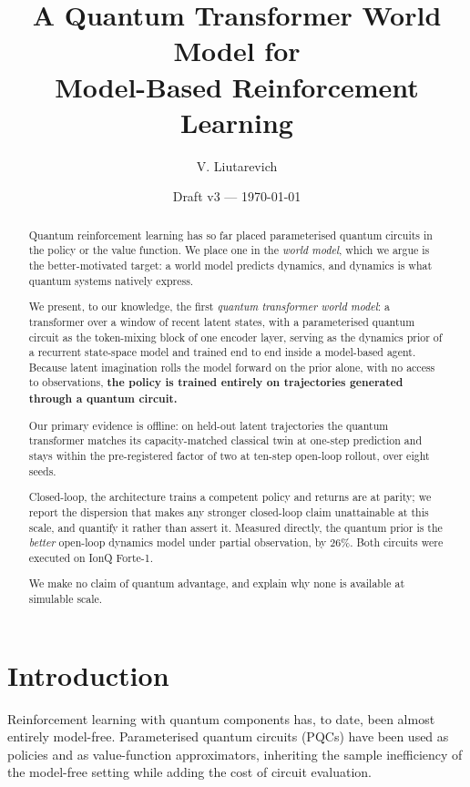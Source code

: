 \documentclass[11pt]{article}
\title{\bfseries A Quantum Transformer World Model for\\
       Model-Based Reinforcement Learning}
\author{V. Liutarevich}
\date{Draft v3 --- \today}
\newif\ifdraft
\newcommand{\pend}[1]{%
  \ifdraft\textcolor{PendFG}{\textbf{[TODO:} \textit{#1}\textbf{]}}\fi}
\begin{document}
\maketitle

\begin{abstract}
Quantum reinforcement learning has so far placed parameterised quantum
circuits in the policy or the value function. We place one in the
\emph{world model}, which we argue is the better-motivated target: a
world model predicts dynamics, and dynamics is what quantum systems
natively express.

We present, to our knowledge, the first \emph{quantum transformer world
model}: a transformer over a window of recent latent states, with a
parameterised quantum circuit as the token-mixing block of one encoder
layer, serving as the dynamics prior of a recurrent state-space model
and trained end to end inside a model-based agent. Because latent
imagination rolls the model forward on the prior alone, with no access
to observations, \textbf{the policy is trained entirely on trajectories
generated through a quantum circuit.}

Our primary evidence is offline: on held-out latent trajectories the
quantum transformer matches its capacity-matched classical twin at
one-step prediction and stays within the pre-registered factor of two at
ten-step open-loop rollout, over eight seeds.
\pend{replace with the measured figures from the width-matched context
sweep; see Section~\ref{sec:offline}}
Closed-loop, the architecture trains a competent policy and returns are
at parity; we report the dispersion that makes any stronger closed-loop
claim unattainable at this scale, and quantify it rather than assert it.
Measured directly, the quantum prior is the \emph{better} open-loop
dynamics model under partial observation, by $26\%$. Both circuits were
executed on IonQ Forte-1.

We make no claim of quantum advantage, and explain why none is available
at simulable scale.
\end{abstract}

\section{Introduction}
Reinforcement learning with quantum components has, to date, been almost
entirely model-free. Parameterised quantum circuits (PQCs) have been
used as policies and as value-function approximators, inheriting the
sample inefficiency of the model-free setting while adding the cost of
circuit evaluation.
\end{document}

